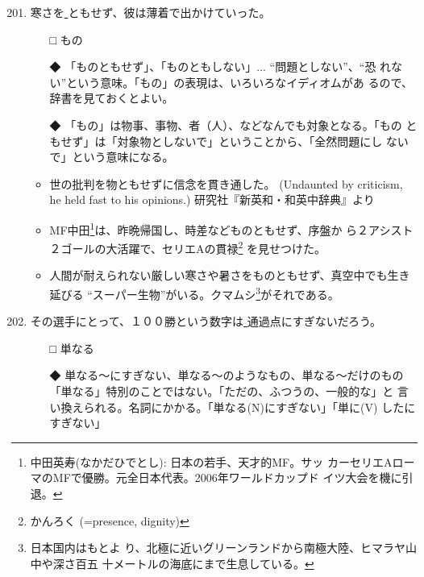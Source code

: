 \documentclass[
uplatex,
b5paper,
10pt,
dvipdfmx
]{jsbook}
\begin{document}
\begin{enumerate}
\setcounter{enumi}{200}

\item 寒さを\underline{   }ともせず、彼は薄着で出かけていった。 

\begin{itemize}
\item[□] もの
\item[◆] 「ものともせず」、「ものともしない」... ``問題としない''、``恐
	  れない''という意味。「もの」の表現は、いろいろなイディオムがあ
	  るので、辞書を見ておくとよい。

\item[◆] 「もの」は物事、事物、者（人）、などなんでも対象となる。「もの
	  ともせず」は「対象物としないで」ということから、「全然問題にし
	  ないで」という意味になる。
\end{itemize}

\begin{itemize}
 \item 世の批判を物ともせずに信念を貫き通した。
      (Undaunted by criticism, he held fast to his opinions.)
       研究社『新英和・和英中辞典』より
\item MF中田\footnote{中田英寿(なかだひでとし): 日本の若手、天才的MF。サッ
      カーセリエAローマのMFで優勝。元全日本代表。2006年ワールドカップド
      イツ大会を機に引退。}は、昨晩帰国し、時差などものともせず、序盤か
      ら２アシスト２ゴールの大活躍で、セリエAの貫禄\footnote{かんろく
      (=presence, dignity)} を見せつけた。
\item 人間が耐えられない厳しい寒さや暑さをものともせず、真空中でも生き
       延びる ``スーパー生物''がいる。クマムシ\footnote{日本国内はもとよ
       り、北極に近いグリーンランドから南極大陸、ヒマラヤ山中や深さ百五
       十メートルの海底にまで生息している。}がそれである。
\end{itemize}

\item その選手にとって、１００勝という数字は\underline{   }通過点にすぎないだろう。 

\begin{itemize}
\item[□] 単なる
\item[◆] 単なる〜にすぎない、単なる〜のようなもの、単なる〜だけのもの
	  「単なる」特別のことではない。「ただの、ふつうの、一般的な」と
	  言い換えられる。名詞にかかる。「単なる(N)にすぎない」「単に(V)
	  したにすぎない」
\end{itemize}


\end{enumerate}
\end{document}
